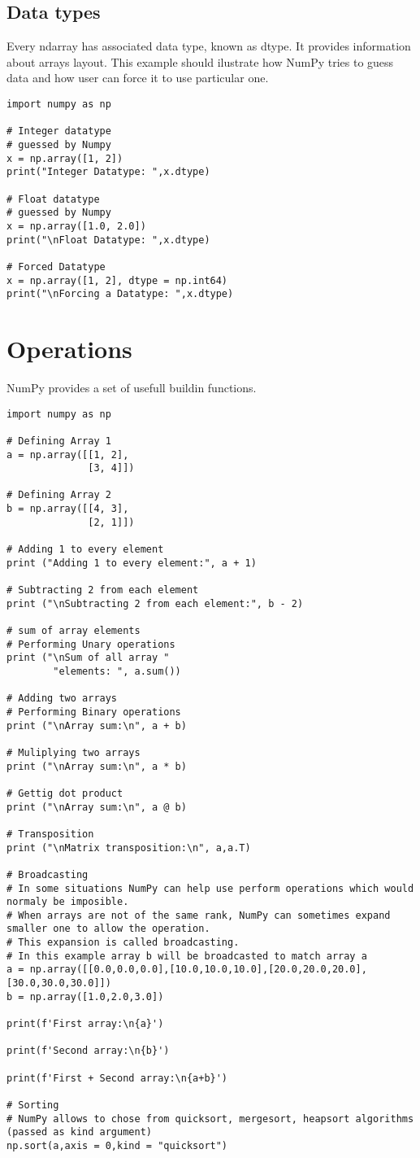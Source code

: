 \documentclass{article}
\begin{document}
\subsection{Data types}
Every ndarray has associated data type, known as dtype.
It provides information about arrays layout.
This example should ilustrate how NumPy tries to guess data 
and how user can force it to use particular one.
\begin{lstlisting}
import numpy as np

# Integer datatype
# guessed by Numpy
x = np.array([1, 2])
print("Integer Datatype: ",x.dtype)

# Float datatype
# guessed by Numpy
x = np.array([1.0, 2.0])
print("\nFloat Datatype: ",x.dtype)

# Forced Datatype
x = np.array([1, 2], dtype = np.int64)
print("\nForcing a Datatype: ",x.dtype)
\end{lstlisting}
\section{Operations}
NumPy provides a set of usefull buildin functions.

\begin{lstlisting}
import numpy as np

# Defining Array 1
a = np.array([[1, 2],
              [3, 4]])
  
# Defining Array 2
b = np.array([[4, 3],
              [2, 1]])
                
# Adding 1 to every element
print ("Adding 1 to every element:", a + 1)
  
# Subtracting 2 from each element
print ("\nSubtracting 2 from each element:", b - 2)
  
# sum of array elements
# Performing Unary operations
print ("\nSum of all array "
        "elements: ", a.sum())

# Adding two arrays
# Performing Binary operations
print ("\nArray sum:\n", a + b)

# Muliplying two arrays
print ("\nArray sum:\n", a * b)

# Gettig dot product
print ("\nArray sum:\n", a @ b)

# Transposition
print ("\nMatrix transposition:\n", a,a.T)

# Broadcasting
# In some situations NumPy can help use perform operations which would normaly be imposible.
# When arrays are not of the same rank, NumPy can sometimes expand smaller one to allow the operation.
# This expansion is called broadcasting.
# In this example array b will be broadcasted to match array a
a = np.array([[0.0,0.0,0.0],[10.0,10.0,10.0],[20.0,20.0,20.0],[30.0,30.0,30.0]]) 
b = np.array([1.0,2.0,3.0])

print(f'First array:\n{a}')

print(f'Second array:\n{b}')

print(f'First + Second array:\n{a+b}')

# Sorting
# NumPy allows to chose from quicksort, mergesort, heapsort algorithms (passed as kind argument)
np.sort(a,axis = 0,kind = "quicksort")
\end{lstlisting}
\end{document}
